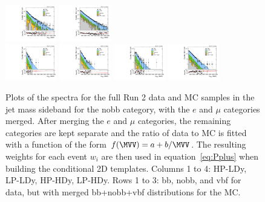 \begin{figure}[htbp]
  \includegraphics[width=0.2\textwidth]{fig/analysisAppendix/slopesSB_b1_allL_HP_nobb_HDy_Run2_mWV_1OverX.pdf}
  \includegraphics[width=0.2\textwidth]{fig/analysisAppendix/slopesSB_b1_allL_LP_nobb_HDy_Run2_mWV_1OverX.pdf}\\
  \includegraphics[width=0.2\textwidth]{fig/analysisAppendix/slopesSB_b1_allL_HP_vbf_LDy_Run2_mWV_1OverX.pdf}
  \includegraphics[width=0.2\textwidth]{fig/analysisAppendix/slopesSB_b1_allL_LP_vbf_LDy_Run2_mWV_1OverX.pdf}
  \includegraphics[width=0.2\textwidth]{fig/analysisAppendix/slopesSB_b1_allL_HP_vbf_HDy_Run2_mWV_1OverX.pdf}
  \includegraphics[width=0.2\textwidth]{fig/analysisAppendix/slopesSB_b1_allL_LP_vbf_HDy_Run2_mWV_1OverX.pdf}\\
  \caption{
    Plots of the \MVV spectra for the full Run 2 data and MC samples in the jet mass sideband for the nobb category, with the $e$ and $\mu$ categories merged.
    After merging the $e$ and $\mu$ categories, the remaining categories are kept separate and the ratio of data to MC is fitted with a function of the form $f(\MVV)=a+b/\MVV$.
    The resulting weights for each event $w_i$ are then used in equation~\ref{eq:Pplus} when building the conditional 2D templates.
    Columns 1 to 4: HP-LDy, LP-LDy, HP-HDy, LP-HDy.
    Rows 1 to 3: bb, nobb, and vbf for data, but with merged bb+nobb+vbf distributions for the MC.
  }
  \label{fig:nonResMvvSpectrumReweighting}
\end{figure}

